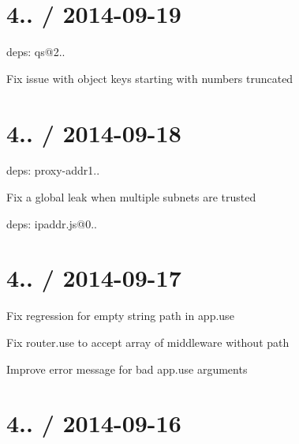 {\ttfamily \section*{4.. / 2014-\/09-\/19 }}

{\ttfamily }

{\ttfamily 
\begin{DoxyItemize}
\item deps\+: qs@2..
\begin{DoxyItemize}
\item Fix issue with object keys starting with numbers truncated
\end{DoxyItemize}
\end{DoxyItemize}}

{\ttfamily \section*{4.. / 2014-\/09-\/18 }}

{\ttfamily }

{\ttfamily 
\begin{DoxyItemize}
\item deps\+: proxy-\/addr1..
\begin{DoxyItemize}
\item Fix a global leak when multiple subnets are trusted
\item deps\+: ipaddr.\+js@0..
\end{DoxyItemize}
\end{DoxyItemize}}

{\ttfamily \section*{4.. / 2014-\/09-\/17 }}

{\ttfamily }

{\ttfamily 
\begin{DoxyItemize}
\item Fix regression for empty string {\ttfamily path} in {\ttfamily app.\+use}
\item Fix {\ttfamily router.\+use} to accept array of middleware without path
\item Improve error message for bad {\ttfamily app.\+use} arguments
\end{DoxyItemize}}

{\ttfamily \section*{4.. / 2014-\/09-\/16 }}

